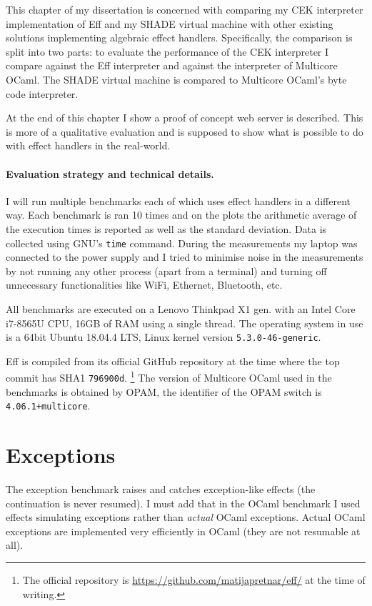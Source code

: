 \documentclass[class=article, crop=false]{standalone}
\begin{document}
This chapter of my dissertation is concerned with comparing my CEK interpreter implementation of Eff and my SHADE virtual machine with
other existing solutions implementing algebraic effect handlers. Specifically, the comparison is split into two parts: to evaluate the performance
of the CEK interpreter I compare against the Eff interpreter and against the interpreter of Multicore OCaml. The SHADE virtual machine is compared
to Multicore OCaml's byte code interpreter.

At the end of this chapter I show a proof of concept web server is described. This is more of a qualitative evaluation and is supposed to show
what is possible to do with effect handlers in the real-world.

\paragraph{Evaluation strategy and technical details.}

I will run multiple benchmarks each of which uses effect handlers in a different way. Each benchmark is ran 10 times and on the plots
the arithmetic average of the execution times is reported as well as the standard deviation. Data is collected using GNU's \verb|time| command.
During the measurements my laptop was connected to the power supply and I tried to minimise noise in the measurements by not running any other
process (apart from a terminal) and turning off unnecessary functionalities like WiFi, Ethernet, Bluetooth, etc.

All benchmarks are executed on a Lenovo Thinkpad X1  gen. with
an Intel Core i7-8565U CPU, 16GB of RAM using a single thread. The operating system in use is a 64bit Ubuntu 18.04.4 LTS, Linux kernel version \verb|5.3.0-46-generic|.

Eff is compiled from its official GitHub repository at the time where the top commit has SHA1 \verb|796900d|.
\footnote{The official repository is \url{https://github.com/matijapretnar/eff/} at the time of writing.}
The version of Multicore OCaml used in the benchmarks is obtained by OPAM, the identifier of the OPAM switch is \verb|4.06.1+multicore|.

\section{Exceptions}

The exception benchmark raises and catches exception-like effects (the continuation is never resumed). I must add that
in the OCaml benchmark I used effects simulating exceptions rather than \emph{actual} OCaml exceptions. Actual OCaml
exceptions are implemented very efficiently in OCaml (they are not resumable at all).
\end{document}
